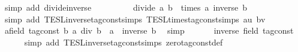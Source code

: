 \begin{isabellebody}
\ {\isacharparenleft}simp\ add{\isacharcolon}\ divide{\isacharunderscore}inverse{\isacharparenright}\isanewline
\ \ \ \ \ \ \isamarkupfalse%
\ \isamarkupfalse%
\ {\isacartoucheopen}divide\ a\ b\ {\isacharequal}\ times\ a\ {\isacharparenleft}inverse\ b{\isacharparenright}{\isacartoucheclose}\isanewline
\ \ \ \ \ \ \ \ \isamarkupfalse%
\ {\isacharparenleft}simp\ add{\isacharcolon}\ TESL{\isachardot}inverse{\isacharunderscore}tag{\isacharunderscore}const{\isachardot}simps\ TESL{\isachardot}times{\isacharunderscore}tag{\isacharunderscore}const{\isachardot}simps\ au\ bv{\isacharparenright}\isanewline
\ \ \ \ \isacommand{{\isacharbraceright}}\isamarkupfalse%
\ \isamarkupfalse%
\ {\isacartoucheopen}{\isasymAnd}{\isacharparenleft}a{\isacharcolon}{\isacharcolon}{\isacharparenleft}{\isacharprime}{\isasymtau}{\isacharcolon}{\isacharcolon}field\ tag{\isacharunderscore}const{\isacharparenright}{\isacharparenright}\ b{\isachardot}\ a\ div\ b\ {\isacharequal}\ a\ {\isacharasterisk}\ inverse\ b{\isacartoucheclose}\ \isamarkupfalse%
\ simp\isanewline
\ \ \isamarkupfalse%
\isanewline
\ \ \isamarkupfalse%
\ {\isacartoucheopen}inverse\ {\isacharparenleft}{}{\isacharcolon}{\isacharcolon}{\isacharparenleft}{\isacharprime}{\isasymtau}{\isacharcolon}{\isacharcolon}field\ tag{\isacharunderscore}const{\isacharparenright}{\isacharparenright}\ {\isacharequal}\ {}{\isacartoucheclose}\isanewline
\ \ \ \ \isamarkupfalse%
\ {\isacharparenleft}simp\ add{\isacharcolon}\ TESL{\isachardot}inverse{\isacharunderscore}tag{\isacharunderscore}const{\isachardot}simps\ zero{\isacharunderscore}tag{\isacharunderscore}const{\isacharunderscore}def{\isacharparenright}\isanewline
{}\isamarkupfalse%
%
\endisatagproof
{\isafoldproof}%
%
\isadelimproof
%
\endisadelimproof
\isanewline
\isanewline
{}\isamarkupfalse%
\isanewline
\isanewline
%
\end{isabellebody}
